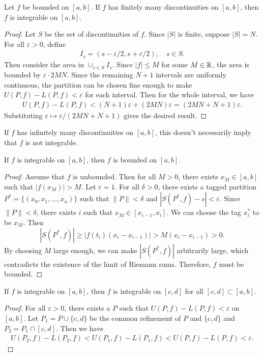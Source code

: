 \begin{theorem}
    Let $f$ be bounded on $[a,b]$. If $f$ has finitely many discontinuities on $[a,b]$, then $f$ is integrable on $[a,b]$.
\end{theorem}
\begin{proof}
    Let $S$ be the set of discontinuities of $f$. Since $|S|$ is finite, suppose $|S|=N$. For all $\varepsilon>0$, define
    \begin{align*}
        I_s = (s-\varepsilon/2, s+\varepsilon/2), \quad s\in S.
    \end{align*}
    Then consider the area in $\cup_{s\in S}I_s$. Since $|f|\le M$ for some $M\in \mathbb{R}$, the area is bounded by $\varepsilon \cdot 2MN$. Since the remaining $N+1$ intervals are uniformly continuous, the partition can be chosen fine enough to make $U(P,f)-L(P,f)<\varepsilon$ for each interval. Then for the whole interval, we have
    \begin{align*}
        U(P,f) - L(P,f) < (N+1)\varepsilon + (2MN)\varepsilon = (2MN + N + 1)\varepsilon.
    \end{align*}  
    Substituting $\varepsilon \mapsto \varepsilon/(2MN + N + 1)$ gives the desired result.
\end{proof}

\begin{remark}
    If $f$ has infinitely many discontinuities on $[a,b]$, this doesn't necessarily imply that $f$ is not integrable.
\end{remark}

\begin{remark}
    If $f$ is integrable on $[a,b]$, then $f$ is bounded on $[a,b]$.
\end{remark}
\begin{proof}
    Assume that $f$ is unbounded. Then for all $M>0$, there exists $x_M \in [a,b]$ such that $|f(x_M)| > M$. Let $\varepsilon = 1$. For all $\delta > 0$, there exists a tagged partition $P^* = \{(x_0,x_1,...,x_n)\}$ such that $\|P\| < \delta$ and $|S(P^*,f) - s| < \varepsilon$. Since $\|P\| < \delta$, there exists $i$ such that $x_M \in [x_{i-1}, x_i]$. We can choose the tag $x_i^*$ to be $x_M$. Then
    \[
        |S(P^*,f)| \ge |f(t_i)(x_i - x_{i-1})| > M(x_i - x_{i-1}) > 0.
    \]
    By choosing $M$ large enough, we can make $|S(P^*,f)|$ arbitrarily large, which contradicts the existence of the limit of Riemann sums. Therefore, $f$ must be bounded.
\end{proof}

\begin{theorem}
    If $f$ is integrable on $[a,b]$, then $f$ is integrable on $[c,d]$ for all $[c,d]\subset[a,b]$.
\end{theorem}
\begin{proof}
    For all $\varepsilon>0$, there exists a $P$ such that $U(P,f) - L(P,f) < \varepsilon$ on $[a,b]$. Let $P_1 = P \cup \{c,d\}$ be the common refinement of $P$ and $\{c,d\}$ and $P_2 = P_1 \cap [c,d]$. Then we have
    \begin{align*}
        U(P_2, f) - L(P_2, f) < U(P_1, f) - L(P_1, f) < U(P,f) - L(P,f) < \varepsilon.
    \end{align*}
\end{proof}

